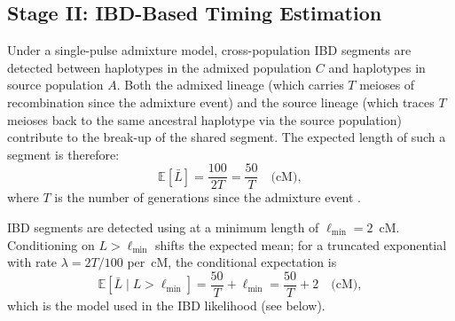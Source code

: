 \subsection*{Stage II: IBD-Based Timing Estimation}

Under a single-pulse admixture model, cross-population IBD segments are
detected between haplotypes in the admixed population $C$ and haplotypes
in source population $A$.
Both the admixed lineage (which carries $T$ meioses of recombination since
the admixture event) and the source lineage (which traces $T$ meioses
back to the same ancestral haplotype via the source population) contribute
to the break-up of the shared segment.
The expected length of such a segment is therefore:
\begin{equation}
  \mathbb{E}[\bar{L}] = \frac{100}{2T} = \frac{50}{T} \quad\text{(cM)},
  \label{eq:ibd_timing}
\end{equation}
where $T$ is the number of generations since the admixture event
\citep{Palamara2012}.

IBD segments are detected using \hapibd{} \citep{Browning2020} at a minimum
length of $\ell_{\min} = 2$~cM.
Conditioning on $L > \ell_{\min}$ shifts the expected mean; for a truncated
exponential with rate $\lambda = 2T/100$ per~cM, the conditional expectation is
\begin{equation}
  \mathbb{E}[\bar{L} \mid L > \ell_{\min}]
    = \frac{50}{T} + \ell_{\min}
    = \frac{50}{T} + 2 \quad\text{(cM)},
  \label{eq:ibd_trunc}
\end{equation}
which is the model used in the IBD likelihood (see below).

